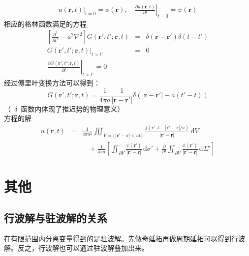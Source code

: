 \documentclass[12pt,a4paper]{article}
\newcommand\diff{\,\mathrm{d}}
\renewcommand*{\vec}[1]{\bm{#1}}%
\renewcommand{\[}{\ $\displaystyle}
\renewcommand{\]}{$\ }%
\newcommand{\pard}[2]{\ensuremath{\frac{\partial #1}{\partial #2}}}
\newcommand{\pardsq}[2]{\ensuremath{\frac{\partial^2 #1}{\partial #2^2}}}
\begin{document}
\begin{enumerate}
\begin{eqnarray*}
	    	  u(\vec r ,t)|_{t=0} = \phi(\vec r),\quad \left.\pard{u(\vec r ,t)}{t}\right|_{t=0} = \psi(\vec r)
	    	\end{eqnarray*}
	    	相应的格林函数满足的方程
	    	\begin{eqnarray*}
	    	  \left[\pardsq{}{t} - a^2\nabla^2\right]G(\vec r',t';\vec r,t) &=& \delta(\vec r - \vec r')\delta(t - t') \\
	    	  G(\vec r',t';\vec r,t)|_{t>t'} &=& 0 \\
	    	  \left.\pard{G(\vec r',t';\vec r,t)}{t}\right|_{t>t'} = 0
	    	\end{eqnarray*}
	    	经过傅里叶变换方法可以得到：
	    	$$
	    	  G(\vec r',t';\vec r,t) = \frac{1}{4\pi a}\frac{1}{|\vec r - \vec r'|}\delta(|\vec r - \vec r'| - a(t'-t))
	    	$$
	    	（\[\delta\]函数内体现了推迟势的物理意义）\\
	    	方程的解
	    	\begin{eqnarray*}
	    	  u(\vec r ,t) &=& \frac{1}{4\pi a^2}\iiint_{V=\{|\vec r'-\vec r|<at\}}\frac{f(r',t-|\vec r'-\vec r|/a)}{|\vec r'-\vec r|}\diff V \\
	    	  &&\quad + \frac{1}{4\pi a}\left[\iint_{\partial V}\frac{\psi(\vec r')}{|\vec r'-\vec r|}\diff\sigma' + \pard{}{t}\iint_{\partial V}\frac{\phi(\vec r')}{|\vec r'-\vec r|}\diff \Sigma'\right]
	    	\end{eqnarray*}
	  \end{enumerate}
	  
\section{其他}
	\subsection{行波解与驻波解的关系}
		在有限范围内分离变量得到的是驻波解。先做奇延拓再做周期延拓可以得到行波解。反之，行波解也可以通过驻波解叠加出来。
		
\end{document}

